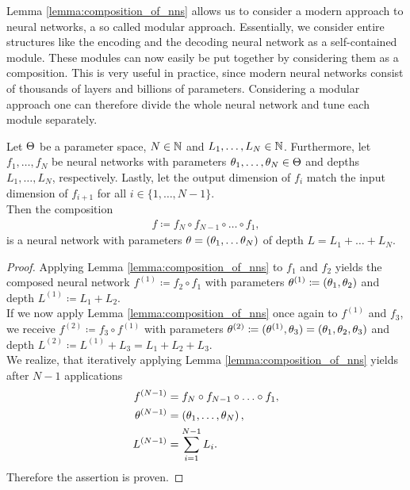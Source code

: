 Lemma \ref{lemma:composition_of_nns} allows us to consider a modern approach to neural networks, a so called modular approach. Essentially, we consider entire structures like the encoding and the decoding neural network as a self-contained module. These modules can now easily be put together by considering them as a composition. This is very useful in practice, since modern neural networks consist of thousands of layers and billions of parameters. Considering a modular approach one can therefore divide the whole neural network and tune each module separately.


\begin{theorem}
Let $\operatorname{\Theta}$ be a parameter space, $N\in \operatorname{\mathbb{N}}$ and $L_1,\ldots,L_N\in \operatorname{\mathbb{N}}$. Furthermore, let $f_1,\ldots,f_N$ be neural networks with parameters $\theta_1,\ldots,\theta_N\in\operatorname{\Theta}$ and depths $L_1,\ldots,L_N$, respectively. Lastly, let the output dimension of $f_i$ match the input dimension of $f_{i+1}$ for all $i\in\{1,\ldots,N-1\}$.\\
Then the composition
\begin{align*}
f \coloneqq f_{N} \circ f_{N-1} \circ \ldots \circ f_1,
\end{align*}
is a neural network with parameters $\theta = (\theta_1,\ldots\theta_N)$ of depth $L = L_1 + \ldots + L_N$.
\end{theorem}


\begin{proof}
Applying Lemma \ref{lemma:composition_of_nns} to $f_1$ and $f_2$ yields the composed neural network $f^{(1)} \coloneqq f_2 \circ f_1$ with parameters $\theta^{(1)} \coloneqq (\theta_1, \theta_2)$ and depth $L^{(1)}\coloneqq L_1 + L_2$.\\
If we now apply Lemma \ref{lemma:composition_of_nns} once again to $f^{(1)}$ and $f_3$, we receive $f^{(2)} \coloneqq f_3 \circ f^{(1)}$ with parameters $\theta^{(2)} \coloneqq (\theta^{(1)}, \theta_3) = (\theta_1, \theta_2, \theta_3)$ and depth $L^{(2)}\coloneqq L^{(1)} + L_3 = L_1 + L_2 + L_3$.\\
We realize, that iteratively applying Lemma \ref{lemma:composition_of_nns} yields  after $N-1$ applications
\begin{align*}
f^{(N-1)} &= f_{N} \circ f_{N-1} \circ \ldots \circ f_1,\\
\theta^{(N-1)}&= \left(\theta_1, \ldots, \theta_N \right),\\
L^{(N-1)} &= \sum_{i=1}^{N-1} L_i.
\end{align*}
Therefore the assertion is proven.
\end{proof}


